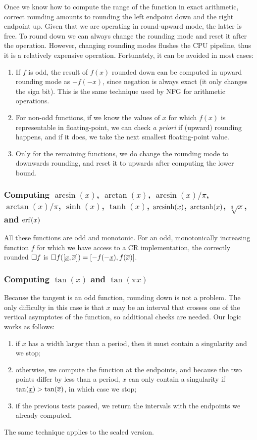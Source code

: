 Once we know how to compute the range of the function in exact arithmetic, correct rounding amounts to rounding the left endpoint down and the right endpoint up. Given that we are operating in round-upward mode, the latter is free.
To round down we can always change the rounding mode and reset it after the operation. However, changing rounding modes flushes the CPU pipeline, thus it is a relatively expensive operation.
Fortunately, it can be avoided in most cases:
\begin{enumerate}
	\item If $f$ is odd, the result of $f(x)$ rounded down can be computed in upward rounding mode as $-f(-x)$, since negation is always exact (it only changes the sign bit). This is the same technique used by NFG for arithmetic operations.
	\item For non-odd functions, if we know the values of $x$ for which $f(x)$ is representable in floating-point, we can check \emph{a priori} if (upward) rounding happens, and if it does, we take the next smallest floating-point value.
	\item Only for the remaining functions, we do change the rounding mode to downwards rounding, and reset it to upwards after computing the lower bound.
\end{enumerate}

\subsubsection{Computing $\arcsin(x)$, $\arctan(x)$, $\arcsin(x)/\pi$, $\arctan(x)/\pi$, $\sinh(x)$, $\tanh(x)$, $\operatorname{arcsinh}(x)$, $\operatorname{arctanh}(x)$, $\sqrt[3]{x}$, and $\operatorname{erf}(x)$}
All these functions are odd and monotonic.
For an odd, monotonically increasing function $f$ for which we have access to a CR implementation, the correctly rounded $\Box f$ is $\Box f([\underline{x}, \overline{x}]) = [-f(-\underline{x}), f(\overline{x})]$.

\subsubsection{Computing $\tan(x)$ and $\tan(\pi x)$}
Because the tangent is an odd function, rounding down is not a problem.
The only difficulty in this case is that $x$ may be an interval that crosses one of the vertical asymptotes of the function, so additional checks are needed.
Our logic works as follows:
\begin{enumerate}
	\item if $x$ has a width larger than a period, then it must contain a singularity and we stop;
	\item otherwise, we compute the function at the endpoints, and because the two points differ by less than a period, $x$ can only contain a singularity if $\tan(\underline{x}) > \tan(\overline{x})$, in which case we stop;
	\item if the previous tests passed, we return the intervals with the endpoints we already computed.
\end{enumerate}
The same technique applies to the scaled version.

